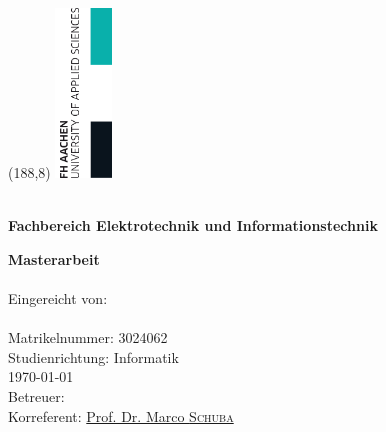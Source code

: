 \thispagestyle{empty}%
\setlength{\oddsidemargin}{0cm}%
\enlargethispage{\baselineskip}
\begin{textblock}{16}(188,8)%
    \includegraphics[width=1.5cm]{Figures/fh_logo_rechts.png}%
 \end{textblock}%
\vspace*{-1.0cm}
\LARGE\textbf\univname\\
\Large\textbf{Fachbereich Elektrotechnik und Informationstechnik}\\
\large \href{https://www.fh-aachen.de/menschen/hoever/}{\supname} 
\vspace{2cm}
\begin{center}
	\LARGE\textbf{Masterarbeit}\\
	\vspace{1.75cm}
	\LARGE \ttitle\\
	\large
	\vspace{2.5cm}
	Eingereicht von:\\
	{\authorname}\\
	Matrikelnummer: 3024062\\
	\vspace{1.5cm}
	Studienrichtung: Informatik\\
	\vspace{1.5cm}
	\today\\
	\vspace{2cm}
	Betreuer: \href{https://www.fh-aachen.de/menschen/hoever/}{\supname}\\
	Korreferent: \href{https://www.fh-aachen.de/menschen/schuba/}{Prof. Dr. Marco \textsc{Schuba}}
\end{center}